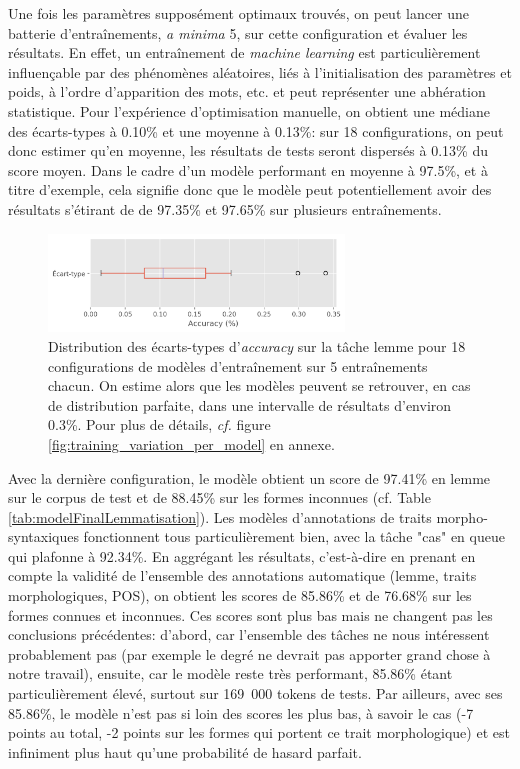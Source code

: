 Une fois les paramètres supposément optimaux trouvés, on peut lancer une batterie d'entraînements, \textit{a minima} 5, sur cette configuration et évaluer les résultats. En effet, un entraînement de \textit{machine learning }est particulièrement influençable par des phénomènes aléatoires, liés à l'initialisation des paramètres et poids, à l'ordre d'apparition des mots, etc. et peut représenter une abhération statistique. Pour l'expérience d'optimisation manuelle, on obtient une médiane des écarts-types à 0.10\% et une moyenne à 0.13\%: sur 18 configurations, on peut donc estimer qu'en moyenne, les résultats de tests seront dispersés à 0.13\% du score moyen. Dans le cadre d'un modèle performant en moyenne à 97.5\%, et à titre d'exemple, cela signifie donc que le modèle peut potentiellement avoir des résultats s'étirant de de 97.35\% et 97.65\% sur plusieurs entraînements.

\begin{figure}[ht]
    \centering
    \includegraphics[width=0.7\textwidth]{results/lemmatisation/entrainement/Variance.png}
    \caption{Distribution des écarts-types d'\textit{accuracy} sur la tâche lemme pour 18 configurations de modèles d'entraînement sur 5 entraînements chacun. On estime alors que les modèles peuvent se retrouver, en cas de distribution parfaite, dans une intervalle de résultats d'environ 0.3\%. Pour plus de détails, \textit{cf.} figure \ref{fig:training_variation_per_model} en annexe.}
    \label{fig:training_variation}
\end{figure}

Avec la dernière configuration, le modèle obtient un score de 97.41\% en lemme sur le corpus de test et de 88.45\% sur les formes inconnues (cf. Table \ref{tab:modelFinalLemmatisation}). Les modèles d'annotations de traits morpho-syntaxiques fonctionnent tous particulièrement bien, avec la tâche "cas" en queue qui plafonne à 92.34\%. En aggrégant les résultats, c'est-à-dire en prenant en compte la validité de l'ensemble des annotations automatique (lemme, traits morphologiques, POS), on obtient les scores de 85.86\% et de 76.68\% sur les formes connues et inconnues. Ces scores sont plus bas mais ne changent pas les conclusions précédentes: d'abord, car l'ensemble des tâches ne nous intéressent probablement pas (par exemple le degré ne devrait pas apporter grand chose à notre travail), ensuite, car le modèle reste très performant, 85.86\% étant particulièrement élevé, surtout sur 169~000 tokens de tests. Par ailleurs, avec ses 85.86\%, le modèle n'est pas si loin des scores les plus bas, à savoir le cas (-7 points au total, -2 points sur les formes qui portent ce trait morphologique) et est infiniment plus haut qu'une probabilité de hasard parfait.

